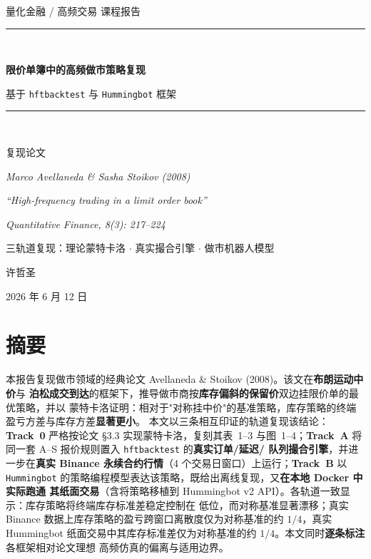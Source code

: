 \documentclass[11pt]{ctexart}
\begin{document}
\begin{titlepage}
\centering
\vspace*{2.2cm}

{\Large 量化金融 / 高频交易 课程报告\par}
\vspace{1.4cm}
\rule{\linewidth}{0.5pt}\\[0.5cm]
{\huge\bfseries 限价单簿中的高频做市策略复现\par}
\vspace{0.5cm}
{\Large 基于 \texttt{hftbacktest} 与 \texttt{Hummingbot} 框架\par}
\vspace{0.4cm}
\rule{\linewidth}{0.5pt}\\[1.0cm]

{\large 复现论文\par}
\vspace{0.3cm}
{\large\itshape Marco Avellaneda \& Sasha Stoikov (2008)\par}
{\large\itshape ``High-frequency trading in a limit order book''\par}
{\large\itshape Quantitative Finance, 8(3): 217--224\par}

\vfill

{\large 三轨道复现：理论蒙特卡洛 $\cdot$ 真实撮合引擎 $\cdot$ 做市机器人模型\par}
\vspace{1.0cm}
{\Large 许哲圣\par}
\vspace{0.4cm}
{\large 2026 年 6 月 12 日\par}
\end{titlepage}

\setcounter{page}{1}
\section*{摘要}
本报告复现做市领域的经典论文 Avellaneda \& Stoikov (2008)。该文在\textbf{布朗运动中价}与
\textbf{泊松成交到达}的框架下，推导做市商按\textbf{库存偏斜的保留价}双边挂限价单的最优策略，并以
蒙特卡洛证明：相对于"对称挂中价"的基准策略，库存策略的终端盈亏方差与库存方差\textbf{显著更小}。
本文以三条相互印证的轨道复现该结论：\textbf{Track~0} 严格按论文 §3.3 实现蒙特卡洛，复刻其表~1--3
与图~1--4；\textbf{Track~A} 将同一套 A--S 报价规则置入 \texttt{hftbacktest} 的\textbf{真实订单/延迟/
队列撮合引擎}，并进一步在\textbf{真实 Binance 永续合约行情}（4 个交易日窗口）上运行；\textbf{Track~B}
以 \texttt{Hummingbot} 的策略编程模型表达该策略，既给出离线复现，又\textbf{在本地 Docker 中实际跑通
其纸面交易}（含将策略移植到 Hummingbot v2 API）。各轨道一致显示：库存策略将终端库存标准差稳定控制在
低位，而对称基准显著漂移；真实 Binance 数据上库存策略的盈亏跨窗口离散度仅为对称基准的约 $1/4$，真实
Hummingbot 纸面交易中其库存标准差仅为对称基准的约 $1/4$。本文同时\textbf{逐条标注}各框架相对论文理想
高频仿真的偏离与适用边界。
\end{document}
